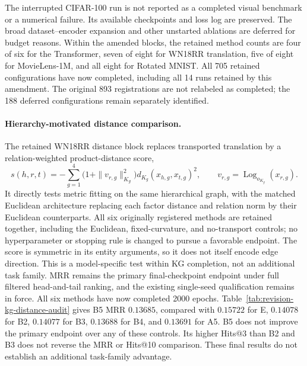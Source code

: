 The interrupted CIFAR-100 run is not reported as a completed visual benchmark or a numerical failure. Its available checkpoints and loss log are preserved. The broad dataset--encoder expansion and other unstarted ablations are deferred for budget reasons. Within the amended blocks, the retained method counts are four of six for the Transformer, seven of eight for WN18RR translation, five of eight for MovieLens-1M, and all eight for Rotated MNIST. All 705 retained configurations have now completed, including all 14 runs retained by this amendment. The original 893 registrations are not relabeled as completed; the 188 deferred configurations remain separately identified.

\paragraph{Hierarchy-motivated distance comparison.}
The retained WN18RR distance block replaces transported translation by a relation-weighted product-distance score,
\begin{equation*}
s(h,r,t)=-\sum_{g=1}^{4}\bigl(1+\|v_{r,g}\|_{K_g}^{2}\bigr)
d_{K_g}(x_{h,g},x_{t,g})^2,
\qquad v_{r,g}=\operatorname{Log}_{o_{K_g}}(x_{r,g}).
\end{equation*}
It directly tests metric fitting on the same hierarchical graph, with the matched Euclidean architecture replacing each factor distance and relation norm by their Euclidean counterparts. All six originally registered methods are retained together, including the Euclidean, fixed-curvature, and no-transport controls; no hyperparameter or stopping rule is changed to pursue a favorable endpoint. The score is symmetric in its entity arguments, so it does not itself encode edge direction. This is a model-specific test within KG completion, not an additional task family. MRR remains the primary final-checkpoint endpoint under full filtered head-and-tail ranking, and the existing single-seed qualification remains in force. All six methods have now completed 2000 epochs. Table~\ref{tab:revision-kg-distance-audit} gives B5 MRR $0.13685$, compared with $0.15722$ for E, $0.14078$ for B2, $0.14077$ for B3, $0.13688$ for B4, and $0.13691$ for A5. B5 does not improve the primary endpoint over any of these controls. Its higher Hits@3 than B2 and B3 does not reverse the MRR or Hits@10 comparison. These final results do not establish an additional task-family advantage.


\FloatBarrier


